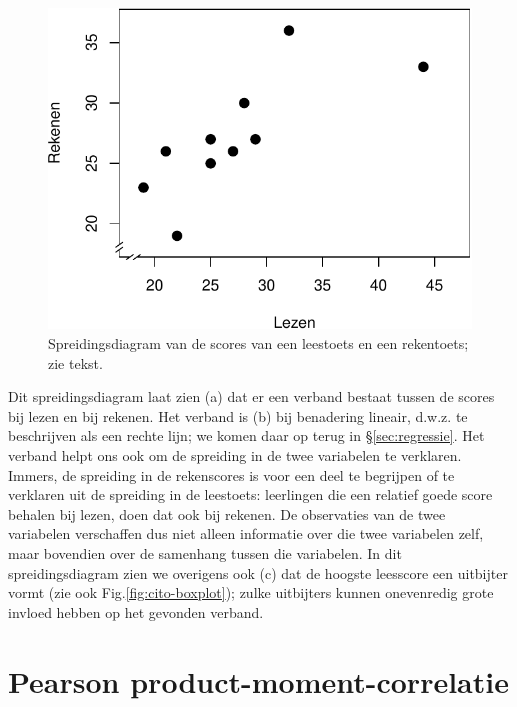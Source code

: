 \documentclass[
]{book}
\begin{document}
\begin{figure}

{\centering \includegraphics{KMS-NL_files/figure-latex/cito-scatter-1} 

}

\caption{Spreidingsdiagram van de scores van een leestoets en een rekentoets; zie tekst.}\label{fig:cito-scatter}
\end{figure}

Dit spreidingsdiagram laat zien (a) dat er een verband bestaat tussen de
scores bij lezen en bij rekenen. Het verband is (b) bij benadering lineair, d.w.z. te
beschrijven als een rechte lijn; we komen daar op terug in
§\ref{sec:regressie}.
Het verband helpt ons ook om de spreiding in de twee variabelen te
verklaren. Immers, de spreiding in de rekenscores is voor een deel te
begrijpen of te verklaren uit de spreiding in de leestoets: leerlingen
die een relatief goede score behalen bij lezen, doen dat ook bij
rekenen. De observaties van de twee variabelen verschaffen dus niet
alleen informatie over die twee variabelen zelf, maar bovendien over de
samenhang tussen die variabelen. In dit spreidingsdiagram zien we
overigens ook (c) dat de hoogste leesscore een uitbijter vormt (zie ook
Fig.\ref{fig:cito-boxplot}); zulke uitbijters kunnen onevenredig
grote invloed hebben op het gevonden verband.

\hypertarget{sec:Pearson}{%
\section{Pearson product-moment-correlatie}\label{sec:Pearson}}
\end{document}
